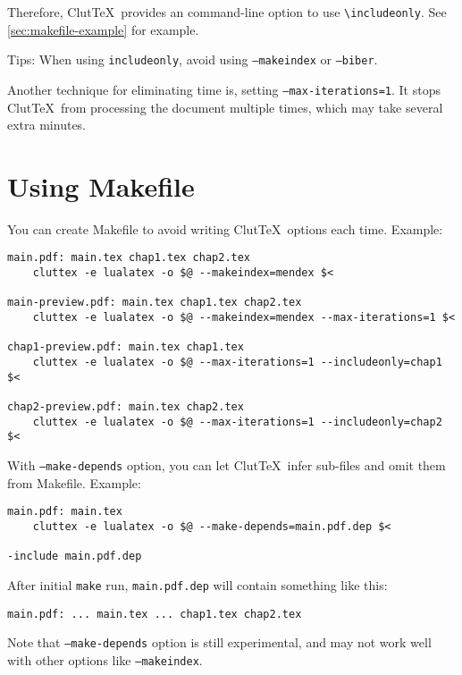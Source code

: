 \documentclass[a4paper]{report}
\newcommand\ClutTeX{Clut\TeX}
\newcommand\texcmd[1]{\texttt{\textbackslash #1}}
\begin{document}
Therefore, \ClutTeX\ provides an command-line option to use \texcmd{includeonly}.
See \autoref{sec:makefile-example} for example.

Tips: When using \texttt{includeonly}, avoid using \texttt{--makeindex} or \texttt{--biber}.

Another technique for eliminating time is, setting \texttt{--max-iterations=1}.
It stops \ClutTeX\ from processing the document multiple times, which may take several extra minutes.

\section{Using Makefile}\label{sec:makefile-example}
You can create Makefile to avoid writing \ClutTeX\ options each time.
Example:
\begin{verbatim}
main.pdf: main.tex chap1.tex chap2.tex
    cluttex -e lualatex -o $@ --makeindex=mendex $<

main-preview.pdf: main.tex chap1.tex chap2.tex
    cluttex -e lualatex -o $@ --makeindex=mendex --max-iterations=1 $<

chap1-preview.pdf: main.tex chap1.tex
    cluttex -e lualatex -o $@ --max-iterations=1 --includeonly=chap1 $<

chap2-preview.pdf: main.tex chap2.tex
    cluttex -e lualatex -o $@ --max-iterations=1 --includeonly=chap2 $<
\end{verbatim}

With \texttt{--make-depends} option, you can let \ClutTeX\ infer sub-files and omit them from Makefile.
Example:

\begin{verbatim}
main.pdf: main.tex
    cluttex -e lualatex -o $@ --make-depends=main.pdf.dep $<

-include main.pdf.dep
\end{verbatim}

After initial \texttt{make} run, \texttt{main.pdf.dep} will contain something like this:
\begin{verbatim}
main.pdf: ... main.tex ... chap1.tex chap2.tex
\end{verbatim}

Note that \texttt{--make-depends} option is still experimental, and may not work well with other options like \texttt{--makeindex}.
\end{document}
